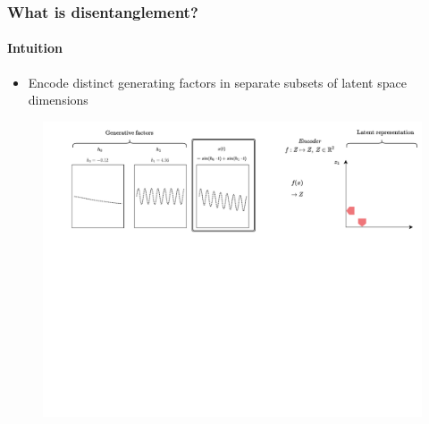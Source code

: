 \documentclass[9pt]{beamer}
\begin{document}
\begin{frame}
\frametitle{What is disentanglement?}
\framesubtitle{Intuition}
	\begin{itemize}%
	\item Encode distinct generating factors in separate subsets of latent space dimensions
	\end{itemize}
\begin{figure}
	\includegraphics[width=.93\linewidth]{figures/intution_3x3_1.pdf}
\end{figure}
\end{frame}
\end{document}
